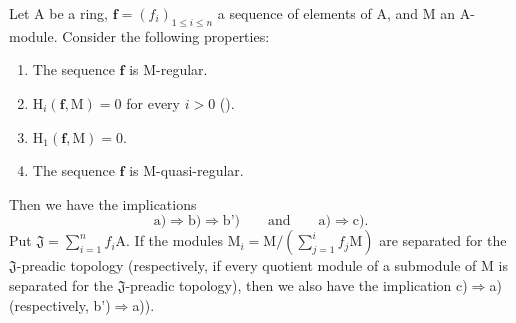 \begin{theorem}[19.5.1]
\label{IV.19.5.1}
Let $\mathrm{A}$ be a ring, $\mathbf{f}=(f_i)_{1\leq i\leq n}$ a sequence of elements of $\mathrm{A}$, and $\mathrm{M}$ an $\mathrm{A}$-module. Consider the following properties:
\begin{enumerate}
\item[\rm a)] The sequence $\mathbf{f}$ is M-regular.
\item[\rm b)] $\mathrm{H}_i(\mathbf{f},\mathrm{M})=0$ for every $i>0$ ().
\item[\rm b')] $\mathrm{H}_1(\mathbf{f},\mathrm{M})=0$.
\item[\rm c)] The sequence $\mathbf{f}$ is M-quasi-regular.
\end{enumerate}
Then we have the implications
\[
  \text{a)}\Longrightarrow\text{b)}\Longrightarrow\text{b')}
  \qquad\text{and}\qquad
  \text{a)}\Longrightarrow\text{c)}.
\]
Put $\mathfrak{J}=\sum_{i=1}^n f_i\mathrm{A}$.
If the modules $\mathrm{M}_i=\mathrm{M}/(\sum_{j=1}^i f_j\mathrm{M})$ are separated for the $\mathfrak{J}$-preadic topology (respectively, if every quotient module of a submodule of $\mathrm{M}$ is separated for the $\mathfrak{J}$-preadic topology), then we also have the implication c)$\Rightarrow$a) (respectively, b')$\Rightarrow$a)).
\end{theorem}

